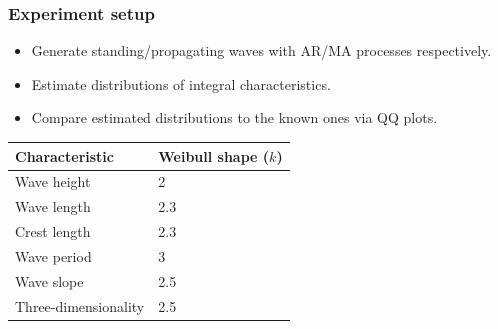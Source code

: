 \documentclass[14pt,aspectratio=169]{beamer}
\begin{document}
	\begin{frame}
		\frametitle{Experiment setup}
		\begin{itemize}
			\item Generate standing/propagating waves with
				  AR/MA processes respectively.
			\item Estimate distributions of integral
				  characteristics.
			\item Compare estimated distributions to the
				  known ones via QQ plots.
		\end{itemize}
		\vfill%
		\begin{center}
			\small
			\begin{tabular}{ll}
				\toprule
				Characteristic & Weibull shape ($k$) \\
				\midrule
				Wave height & 2 \\
				Wave length & 2.3 \\
				Crest length & 2.3 \\
				Wave period & 3 \\
				Wave slope & 2.5 \\
				Three-dimensionality & 2.5 \\
				\bottomrule
			\end{tabular}%
		\end{center}
	\end{frame}

\end{document}
